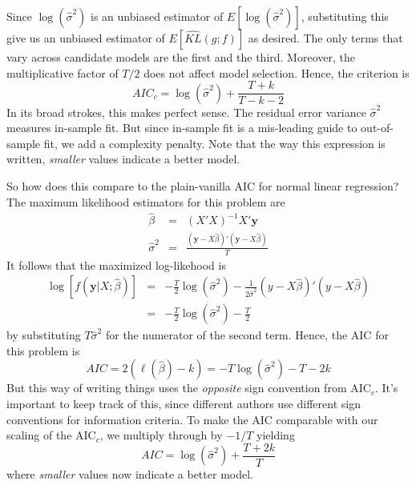 Since $\log(\widehat{\sigma}^2)$ is an unbiased estimator of $E[\log(\widehat{\sigma}^2)]$, substituting this give us an unbiased estimator of $E\left[\widehat{KL}(g;f) \right]$ as desired.
The only terms that vary across candidate models are the first and the third. Moreover, the multiplicative factor of $T/2$ does not affect model selection. Hence, the criterion is
$$AIC_c = \log(\widehat{\sigma}^2) + \frac{T + k}{T - k -2}$$
In its broad strokes, this makes perfect sense. The residual error variance $\widehat{\sigma}^2$ measures in-sample fit. But since in-sample fit is a mis-leading guide to out-of-sample fit, we add a complexity penalty. Note that the way this expression is written, \emph{smaller} values indicate a better model. 

So how does this compare to the plain-vanilla AIC for normal linear regression? The maximum likelihood estimators for this problem are
\begin{eqnarray*}
\widehat{\beta} &=& (X'X)^{-1}X'\mathbf{y}\\
\widehat{\sigma}^2 &=& \frac{(\mathbf{y} - X\widehat{\beta})'(\mathbf{y} - X\widehat{\beta})}{T}
\end{eqnarray*}
It follows that the maximized log-likehood is
\begin{eqnarray*}
\log\left[f(\mathbf{y}|X;\widehat{\beta})\right] &=& -\frac{T}{2} \log(\widehat{\sigma}^2) - \frac{1}{2\widehat{\sigma}^2}(y - X\widehat{\beta})'(y -X\widehat{\beta})\\
&=& -\frac{T}{2} \log(\widehat{\sigma}^2) - \frac{T}{2}
\end{eqnarray*}
by substituting $T\widehat{\sigma}^2$ for the numerator of the second term. Hence, the AIC for this problem is
$$AIC = 2\left(\ell(\widehat{\beta}) - k \right) = -T\log(\widehat{\sigma}^2) - T - 2k $$
But this way of writing things uses the \emph{opposite} sign convention from AIC$_c$. It's important to keep track of this, since different authors use different sign conventions for information criteria. To make the AIC comparable with our scaling of the AIC$_c$, we multiply through by $-1/T$ yielding
$$AIC = \log(\widehat{\sigma}^2) + \frac{T + 2k}{T}$$
where \emph{smaller} values now indicate a better model.

